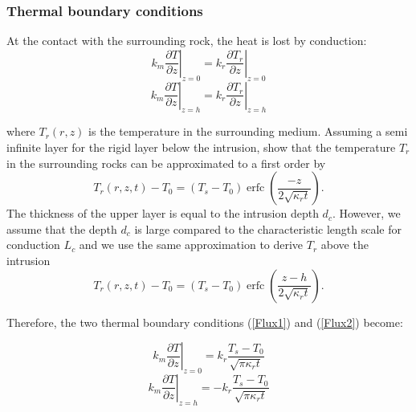 \subsubsection{Thermal boundary conditions}
\label{sec:thermal-boundary-condition}

At  the  contact with  the  surrounding  rock,  the  heat is  lost  by
conduction:
\begin{equation}
  k_m\left.\frac{\partial                                    T}{\partial
      z}\right|_{z=0}=k_r\left.\frac{\partial              T_r}{\partial
      z}\right|_{z=0}
  \label{Flux1}
\end{equation}
\begin{equation}
  k_m\left.\frac{\partial                                  T}{\partial
      z}\right|_{z=h}=k_r\left.\frac{\partial            T_r}{\partial
      z}\right|_{z=h}
  \label{Flux2}
\end{equation}

where  $T_r(r,z)$  is  the  temperature  in  the  surrounding  medium.
Assuming  a  semi  infinite  layer  for  the  rigid  layer  below  the
intrusion, \citet{Carslaw:1959wf}  show that the temperature  $T_r$ in
the surrounding  rocks can  be approximated  to a
first order by
\begin{equation}
  T_r(r,z,t)-T_0=(T_{s}-T_0)\operatorname{erfc}{\left(\frac{-z}{2\sqrt{\kappa_r t}}\right)}.
  \label{eq22}
\end{equation}
The  thickness of  the upper  layer is  equal to  the intrusion  depth
$d_c$. However,  we assume that the  depth $d_c$ is large  compared to
the characteristic  length scale for  conduction $L_c$ and we  use the
same approximation to derive $T_r$ above the intrusion
\begin{equation}
  T_r(r,z,t)-T_0=(T_{s}-T_0)\operatorname{erfc}{\left(\frac{z-h}{2\sqrt{\kappa_r t}}\right)}.
  \label{eq11}
\end{equation}

Therefore,  the  two  thermal boundary  conditions  (\ref{Flux1})  and
(\ref{Flux2}) become:

\begin{equation}
  k_m\left.\frac{\partial                                    T}{\partial
      z}\right|_{z=0}= k_r
  \frac{T_{s}-T_{0}}{\sqrt{\pi \kappa_r t}}
  \label{Flux_1}
\end{equation}
\begin{equation}
  k_m\left.\frac{\partial                                    T}{\partial
      z}\right|_{z=h}= -k_r
  \frac{T_{s}-T_{0}}{\sqrt{\pi \kappa_r t}}
  \label{Flux_2}
\end{equation}


